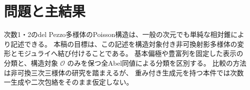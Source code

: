 \documentclass[a4paper,11pt]{ltjsarticle}
\numberwithin{equation}{section}
\theoremstyle{plain}
\theoremstyle{definition}
\theoremstyle{remark}
\newcommand{\OO}{\mathcal O}
\begin{document}
\begin{abstract}
曲面では構造対象の右直交を相対的に構成し，その通常Artin変形を古典曲面の変形で復元する。
可換零切断の開近傍で\'{e}tale局所的な古典曲面族と残余圏のMorita同値を得る。
古典Torelliを入力として，残余圏から定まる古典粗モジュライへの射を構成する。
有限巡回群で同変化した残余圏の楕円Hodge周期を用い，両次数の巡回対称族で
shadowとの二次差が活性Hessian行列式の $1/8$ のJacobian類となることを計算する。
これは非零であり，shadowは残余圏を一般には保存しない。
さらに楕円固定曲線の内在性，逆方程式の厳密な計算証明書，対称群モノドロミーを合わせ，
一般の同じPoisson構造に属する五枚・四枚の残余圏が全て相互に非同値であることを示す。
全非零方向で二次差が消えない古典開集合では，残余圏とshadowを同時に固定する
標識付き形式変形の局所環は二次差だけで決まる。
Fermat点では二変数または三変数の各二乗を零とする環となり，長さは4，8である。
また内在的なGeiser・Bertini対合の同変周期による，全古典点での形式的局所Torelliを得る。
一般Hessian公式については，次数2の多項式延長を一般節点での正則性へ帰着し，
次数1の候補直線の一般階数と滑らかな零方向を記述する。
有限の幾何学的Poisson対称性の奇数周期では見えない補正方向を示す一方，
残余圏を固定する全通常Artin Abel変形の有限行列正規形を与える。
その反標準環の乗法計算と，実際の二次差の一般式は未完了である。
\end{abstract}
\clearpage
\tableofcontents

\section{問題と主結果}
\label{sec:introduction}
次数1・2のdel Pezzo多様体のPoisson構造は、一般の次元でも単純な相対錐により記述できる。
本稿の目標は、この記述を構造対象付き非可換射影多様体の変形とモジュライへ結び付けることである。
基本偏極や豊富列を固定した表示の分類と、構造対象 $\OO$ のみを保つ全Abel同値による分類を区別する。
比較の方法は非可換三次三様体の研究\cite{CubicModuli}を踏まえるが、
重み付き生成元を持つ本件では次数一生成や二次包絡をそのまま仮定しない。
\end{document}
